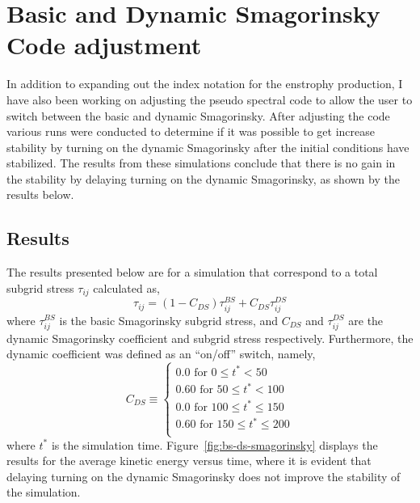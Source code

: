 \section{Basic and Dynamic Smagorinsky Code adjustment}
In addition to expanding out the index notation for the enstrophy
production, I have also been working on adjusting the pseudo spectral code
to allow the user to switch between the basic and dynamic Smagorinsky.
After adjusting the code various runs were conducted to determine if it was
possible to get increase stability by turning on the dynamic Smagorinsky
after the initial conditions have stabilized. The results from these
simulations conclude that there is no gain in the stability by delaying
turning on the dynamic Smagorinsky, as shown by the results below.

\subsection{Results}
The results presented below are for a simulation that correspond to a 
total subgrid stress $\tau_{ij}$ calculated as, 
\begin{equation}
    \tau_{ij} = (1-C_{DS})\tau_{ij}^{BS} + C_{DS}\tau_{ij}^{DS}
\end{equation}
where $\tau_{ij}^{BS}$ is the basic Smagorinsky subgrid stress, and
$C_{DS}$ and $\tau_{ij}^{DS}$ are the dynamic Smagorinsky coefficient and
subgrid stress respectively. Furthermore, the dynamic coefficient was defined
as an ``on/off'' switch, namely,
\begin{equation}
    C_{DS} \equiv          
    \begin{cases}
        0.0     \text{ for $0 \leq t^{*} < 50 $}            \\
        0.60    \text{ for $50 \leq t^{*} < 100 $}          \\
        0.0     \text{ for $100 \leq t^{*} \leq 150 $}      \\
        0.60    \text{ for $150 \leq t^{*} \leq 200 $}      \\
    \end{cases}
\end{equation}
where $t^{*}$ is the simulation time. Figure~\ref{fig:bs-ds-smagorinsky}
displays the results for the average kinetic energy versus time, where it
is evident that delaying turning on the dynamic Smagorinsky does not
improve the stability of the simulation.

